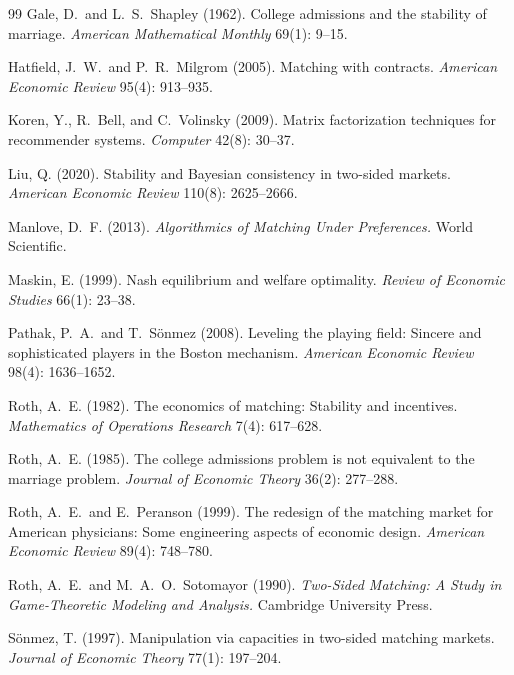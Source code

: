 \documentclass[11pt,a4paper]{article}
\begin{document}
\begin{thebibliography}{99}
Gale, D.\ and L.\ S.\ Shapley (1962).
\newblock College admissions and the stability of marriage.
\newblock \emph{American Mathematical Monthly} 69(1): 9--15.

Hatfield, J.\ W.\ and P.\ R.\ Milgrom (2005).
\newblock Matching with contracts.
\newblock \emph{American Economic Review} 95(4): 913--935.

Koren, Y., R.\ Bell, and C.\ Volinsky (2009).
\newblock Matrix factorization techniques for recommender systems.
\newblock \emph{Computer} 42(8): 30--37.

Liu, Q. (2020).
\newblock Stability and Bayesian consistency in two-sided markets.
\newblock \emph{American Economic Review} 110(8): 2625--2666.

Manlove, D.\ F. (2013).
\newblock \emph{Algorithmics of Matching Under Preferences.}
\newblock World Scientific.

Maskin, E. (1999).
\newblock Nash equilibrium and welfare optimality.
\newblock \emph{Review of Economic Studies} 66(1): 23--38.

Pathak, P.\ A.\ and T.\ Sönmez (2008).
\newblock Leveling the playing field: Sincere and sophisticated players in the Boston mechanism.
\newblock \emph{American Economic Review} 98(4): 1636--1652.

Roth, A.\ E. (1982).
\newblock The economics of matching: Stability and incentives.
\newblock \emph{Mathematics of Operations Research} 7(4): 617--628.

Roth, A.\ E. (1985).
\newblock The college admissions problem is not equivalent to the marriage problem.
\newblock \emph{Journal of Economic Theory} 36(2): 277--288.

Roth, A.\ E.\ and E.\ Peranson (1999).
\newblock The redesign of the matching market for American physicians: Some engineering aspects of economic design.
\newblock \emph{American Economic Review} 89(4): 748--780.

Roth, A.\ E.\ and M.\ A.\ O.\ Sotomayor (1990).
\newblock \emph{Two-Sided Matching: A Study in Game-Theoretic Modeling and Analysis.}
\newblock Cambridge University Press.

Sönmez, T. (1997).
\newblock Manipulation via capacities in two-sided matching markets.
\newblock \emph{Journal of Economic Theory} 77(1): 197--204.

\end{thebibliography}
\end{document}
